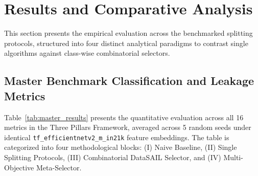 \section{Results and Comparative Analysis}

This section presents the empirical evaluation across the benchmarked splitting protocols, structured into four distinct analytical paradigms to contrast single algorithms against class-wise combinatorial selectors.

\subsection{Master Benchmark Classification and Leakage Metrics}
Table~\ref{tab:master_results} presents the quantitative evaluation across all 16 metrics in the Three Pillars Framework, averaged across 5 random seeds under identical \texttt{tf\_efficientnetv2\_m\_in21k} feature embeddings. The table is categorized into four methodological blocks: (I) Naive Baseline, (II) Single Splitting Protocols, (III) Combinatorial DataSAIL Selector, and (IV) Multi-Objective Meta-Selector.

